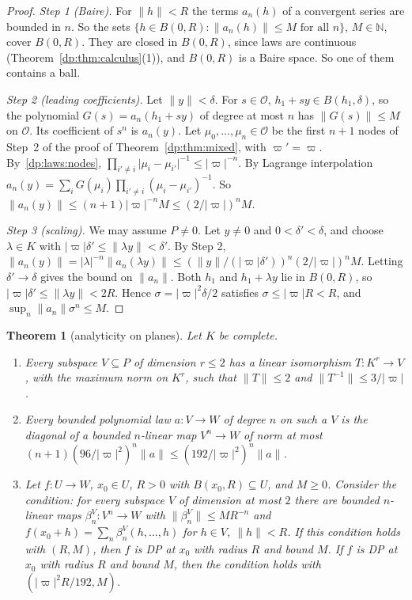 \documentclass[11pt]{amsart}
\newtheorem{theorem}{Theorem}[section]
\theoremstyle{definition}
\theoremstyle{remark}
\numberwithin{equation}{section}
\newcommand{\N}{\mathbb N}
\newcommand{\abs}[1]{\lvert #1\rvert}
\newcommand{\norm}[1]{\lVert #1\rVert}
\theoremstyle{plain}
\theoremstyle{definition}
\theoremstyle{plain}
\begin{document}
\begin{proof}
\emph{Step 1 (Baire).} For $\norm h<R$ the terms $a_n(h)$ of a convergent series are bounded in $n$. So the sets $\{h\in B(0,R):\norm{a_n(h)}\le M\text{ for all }n\}$, $M\in\N$, cover $B(0,R)$. They are closed in $B(0,R)$, since laws are continuous (Theorem~\ref{dp:thm:calculus}(1)), and $B(0,R)$ is a Baire space. So one of them contains a ball.

\emph{Step 2 (leading coefficients).} Let $\norm y<\delta$. For $s\in\mathcal O$, $h_1+sy\in B(h_1,\delta)$, so the polynomial $G(s)=a_n(h_1+sy)$ of degree at most $n$ has $\norm{G(s)}\le M$ on $\mathcal O$. Its coefficient of $s^n$ is $a_n(y)$. Let $\mu_0,\dots,\mu_n\in\mathcal O$ be the first $n+1$ nodes of Step~2 of the proof of Theorem~\ref{dp:thm:mixed}, with $\varpi'=\varpi$. By~\eqref{dp:laws:nodes}, $\prod_{i'\ne i}\abs{\mu_i-\mu_{i'}}^{-1}\le\abs\varpi^{-n}$. By Lagrange interpolation $a_n(y)=\sum_iG(\mu_i)\prod_{i'\ne i}(\mu_i-\mu_{i'})^{-1}$. So $\norm{a_n(y)}\le(n+1)\abs\varpi^{-n}M\le(2/\abs\varpi)^nM$.

\emph{Step 3 (scaling).} We may assume $P\ne0$. Let $y\ne0$ and $0<\delta'<\delta$, and choose $\lambda\in K$ with $\abs\varpi\delta'\le\norm{\lambda y}<\delta'$. By Step 2, $\norm{a_n(y)}=\abs\lambda^{-n}\norm{a_n(\lambda y)}\le(\norm y/(\abs\varpi\delta'))^n(2/\abs\varpi)^nM$. Letting $\delta'\to\delta$ gives the bound on $\norm{a_n}$. Both $h_1$ and $h_1+\lambda y$ lie in $B(0,R)$, so $\abs\varpi\delta'\le\norm{\lambda y}<2R$. Hence $\sigma=\abs\varpi^2\delta/2$ satisfies $\sigma\le\abs\varpi R<R$, and $\sup_n\norm{a_n}\sigma^n\le M$.
\end{proof}

\begin{theorem}[analyticity on planes]\label{dp:thm:planes}
Let $K$ be complete.
\begin{enumerate}
\item Every subspace $V\subseteq P$ of dimension $r\le2$ has a linear isomorphism $T\colon K^r\to V$, with the maximum norm on $K^r$, such that $\norm T\le2$ and $\norm{T^{-1}}\le3/\abs\varpi$.
\item Every bounded polynomial law $a\colon V\to W$ of degree $n$ on such a $V$ is the diagonal of a bounded $n$\nobreakdash-linear map $V^n\to W$ of norm at most $(n+1)(96/\abs\varpi^2)^n\norm a\le(192/\abs\varpi^2)^n\norm a$.
\item Let $f\colon U\to W$, $x_0\in U$, $R>0$ with $B(x_0,R)\subseteq U$, and $M\ge0$. Consider the condition: for every subspace $V$ of dimension at most $2$ there are bounded $n$\nobreakdash-linear maps $\beta^V_n\colon V^n\to W$ with $\norm{\beta^V_n}\le MR^{-n}$ and $f(x_0+h)=\sum_n\beta^V_n(h,\dots,h)$ for $h\in V$, $\norm h<R$. If this condition holds with $(R,M)$, then $f$ is DP at $x_0$ with radius $R$ and bound $M$. If $f$ is DP at $x_0$ with radius $R$ and bound $M$, then the condition holds with $(\abs\varpi^2R/192,M)$.
\end{enumerate}
\end{theorem}
\end{document}
